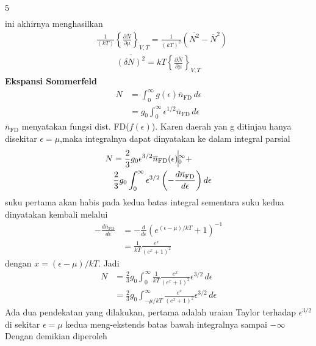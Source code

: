 \documentclass[a4paper  , 6 pt]{article}
\begin{document}
\begin{tiny}
\begin{multicols} {5}
\begin{align}
\end{align}
ini akhirnya menghasilkan
\begin{align}
&\frac{1}{(kT)} \left \lbrace \frac{\partial \overline{N}}{\partial \mu }\right \rbrace_{V,T}  = \frac{1}{(kT)^2} (\overline{N^2} - \overline{N}^2 ) \nonumber
\end{align}
\begin{align}
\overline{(\delta N)^2 } = kT \left \lbrace  \frac{\partial \overline{N}}{\partial \mu}\right \rbrace_{V,T} 
\end{align}
\textbf{Ekspansi Sommerfeld} \newline 
\begin{align}
N & = \int_{0}^{\infty} g(\epsilon) \overline{n}_\mathrm{FD} \, d \epsilon \nonumber \\
& = g_0 \int_{0}^{\infty} \epsilon^{1/2} \overline{n}_\mathrm{FD} \, d\epsilon 
\end{align}
$\overline{n}_\mathrm{FD}$ menyatakan fungsi dist. FD($f(\epsilon)$). 
Karen daerah yan g ditinjau hanya disekitar $\epsilon = \mu $,maka integralnya dapat dinyatakan ke dalam integral parsial
\begin{align}
N  & = 
 \frac{2}{3} g_0 \epsilon^{3/2} \overline{n}_\mathrm{FD} (\epsilon)  \vline_{0}^{\infty} +  \nonumber \\
 &  \frac{2}{3} g_0 \int_0^\infty \epsilon^{3/2} \left( - \frac{d \overline{n}_\mathrm{FD}}{d \epsilon }\right) d \epsilon 
\end{align}  
suku pertama akan habis pada kedua batas integral sementara suku kedua dinyatakan kembali melalui 
\begin{align}
- \frac{d \overline{n}_\mathrm{FD}}{d \epsilon } & = - \frac{d}{d \epsilon } (e^{(\epsilon - \mu )/kT }+ 1)^{-1} \nonumber \\
& = \frac{1}{kT} \frac{e^x}{(e^x + 1) ^2} 
\end{align}
dengan $x = (\epsilon - \mu )/ kT$. \newline Jadi 
\begin{align}
N& = \frac{2}{3} g_0 \int_{0}^{\infty} \frac{1}{kT} \frac{e^x}{(e^x +1)^2} \epsilon^{3/2} \, d \epsilon  \nonumber \\
& = \frac{2}{3} g_0 \int_{-\mu/kT}^{\infty} \frac{e^x}{(e^x + 1)^2} \epsilon^{3/2}  \, d \epsilon
\end{align}
Ada dua pendekatan yang dilakukan, pertama adalah uraian Taylor terhadap $\epsilon^{3/2} $ di sekitar $\epsilon = \mu $  kedua meng-ekstends batas bawah integralnya sampai $- \infty$ 
\newline Dengan demikian diperoleh

\end{multicols}
\end{tiny}
\end{document}
